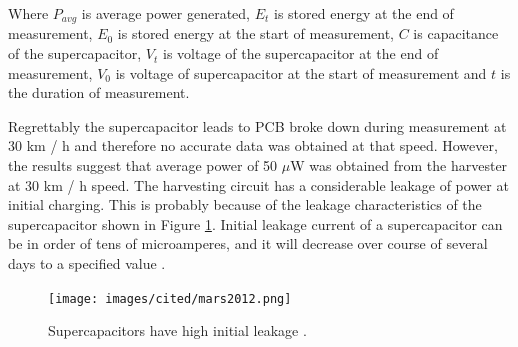 Where $P_{avg}$ is average power generated, $E_t$ is stored energy at the end of measurement, $E_0$ is stored energy at the start of measurement, $C$ is capacitance of the supercapacitor, $V_t$ is voltage of the supercapacitor at the end of measurement, $V_0$ is voltage of supercapacitor at the start of measurement and $t$ is the duration of measurement.

\begin{table}[htb]
\caption{\label{tbl:piezo_harvester_tyre_output} Measured values from tyre test setup, power is calculated with Equation \eqref{eq:pwr_capacitance}.}
\begin{center}
\end{center}
\end{table}

Regrettably the supercapacitor leads to PCB broke down during measurement at 30 km / h and therefore no accurate data was obtained at that speed. However, the results suggest that average power of 50 $\mu$W was obtained from the harvester at 30 km / h speed. The harvesting circuit has a considerable leakage of power at initial charging. This is probably because of the leakage characteristics of the supercapacitor shown in Figure \ref{fig:scap_leakage}. Initial leakage current of a supercapacitor can be in order of tens of microamperes, and it will decrease over course of several days to a specified value \cite{Mars2012}.

\begin{figure}[htb]
\begin{center}
\texttt{[image: images/cited/mars2012.png]}
\end{center}
\caption{\label{fig:scap_leakage} Supercapacitors have high initial leakage \cite{Mars2012}.}
\end{figure}

